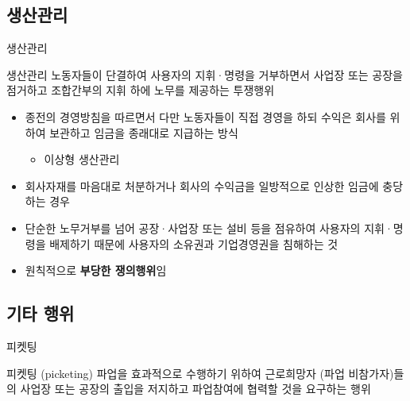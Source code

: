 \documentclass[aspectratio=169,xcolor=dvipsnames,handout]{beamer}
\begin{document}
\subsection{생산관리}
\begin{frame}[allowframebreaks]{생산관리}
    \begin{block}{생산관리}
        노동자들이 단결하여 사용자의 지휘·명령을 거부하면서 사업장 또는 공장을 점거하고 조합간부의 지휘 하에 노무를 제공하는 투쟁행위
    \end{block}
    \begin{itemize}[<+->]
        \item 종전의 경영방침을 따르면서 다만 노동자들이 직접 경영을 하되 수익은 회사를 위하여 보관하고 임금을 종래대로 지급하는 방식
        \begin{itemize}[<+->]
            \item 이상형 생산관리  
        \end{itemize}
    \framebreak\relax
    \item 회사자재를 마음대로 처분하거나 회사의 수익금을 일방적으로 인상한 임금에 충당하는 경우
    \item 단순한 노무거부를 넘어 공장·사업장 또는 설비 등을 점유하여 사용자의 지휘·명령을 배제하기 때문에 사용자의 소유권과 기업경영권을 침해하는 것 
    \item 원칙적으로 \textbf{부당한 쟁의행위}임
    \end{itemize}
\end{frame}

\subsection{기타 행위}
\begin{frame}{피켓팅}
    \begin{block}{피켓팅 (picketing)}
        파업을 효과적으로 수행하기 위하여 근로희망자 (파업 비참가자)들의 사업장 또는 공장의 출입을 저지하고 파업참여에 협력할 것을 요구하는 행위     
    \end{block}
\end{frame}
\end{document}

